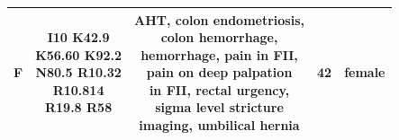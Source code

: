 \documentclass[11pt]{article}
\begin{document}
\begin{table}[htbp]
{\begin{tabular}{lcccc}
F &  \makecell{ I10 K42.9 \\ K56.60 K92.2 \\ N80.5 R10.32 \\ R10.814 \\ R19.8 R58 }  & \makecell{ AHT, colon endometriosis, \\ colon hemorrhage, \\ hemorrhage, pain in FII, \\ pain on deep palpation \\ in FII, rectal urgency, \\ sigma level stricture \\ imaging, umbilical hernia }  & 42 & female \\
\hline
\end{tabular}
}
\end{table}
\end{document}
